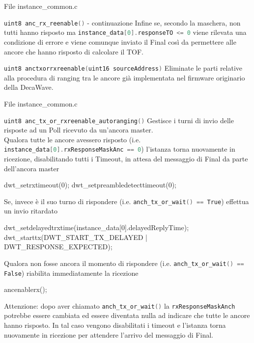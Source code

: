 \begin{frame}{File instance\_common.c}
  \begin{block}{\lstinline[language=C]!uint8 anc_rx_reenable()! - continuazione \newfunction}
    Infine se, secondo la maschera, non tutti hanno risposto ma \lstinline[language=C]!instance_data[0].responseTO <= 0! viene
    rilevata una condizione di errore e viene comunque inviato il Final così da permettere alle ancore che hanno risposto di calcolare il TOF.
  \end{block}
  \begin{block}{\lstinline[language=C]!uint8 anctxorrxreenable(uint16 sourceAddress)! \oldfunction}
    Eliminate le parti relative alla procedura di ranging tra le ancore già implementata nel firmware originario della DecaWave.
  \end{block}
\end{frame}

\begin{frame}[fragile,shrink=30]{File instance\_common.c}
  \begin{block}{\lstinline[language=C]!uint8 anc_tx_or_rxreenable_autoranging()! \newfunction}
    Gestisce i turni di invio delle risposte ad un Poll ricevuto da un'ancora master.\\
    Qualora tutte le ancore avessero risposto (i.e. \lstinline[language=C]!instance_data[0].rxResponseMaskAnc == 0!) l'istanza torna nuovamente in ricezione, disabilitando tutti i
    Timeout, in attesa del messaggio di Final da parte dell'ancora master 
    \begin{C}
      dwt_setrxtimeout(0);
      dwt_setpreambledetecttimeout(0);
    \end{C}
    Se, invece è il suo turno di rispondere (i.e. \lstinline[language=C]!anch_tx_or_wait() == True!) effettua un invio ritardato
    \begin{C}
      dwt_setdelayedtrxtime(instance_data[0].delayedReplyTime);
      dwt_starttx(DWT_START_TX_DELAYED | DWT_RESPONSE_EXPECTED);
    \end{C}
    Qualora non fosse ancora il momento di rispondere (i.e. \lstinline[language=C]!anch_tx_or_wait() == False!) riabilita immediatamente la ricezione
    \begin{C}
      ancenablerx();
    \end{C}    
    \textcolor{dgreen}{Attenzione:} dopo aver chiamato \lstinline[language=C]!anch_tx_or_wait()! la \lstinline[language=C]!rxResponseMaskAnch! potrebbe essere cambiata ed essere diventata
    nulla ad indicare che tutte le ancore hanno risposto. In tal caso vengono disabilitati i timeout e l'istanza torna nuovamente in ricezione per attendere l'arrivo del messaggio di Final.
  \end{block}
\end{frame}

